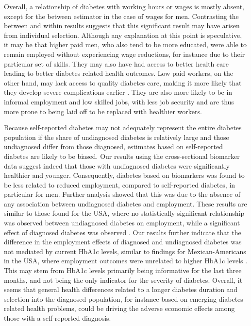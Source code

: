 \documentclass[12pt,english]{article}
\begin{document}
Overall, a relationship of diabetes with working hours or wages is mostly absent, except for the between estimator in the case of wages for men. Contrasting the between and within results suggests that this significant result may have arisen from individual selection. Although any explanation at this point is speculative, it may be that higher paid men, who also tend to be more educated, were able to remain employed without experiencing wage reductions, for instance due to their particular set of skills. They may also have had access to better health care leading to better diabetes related health outcomes. Low paid workers, on the other hand, may lack access to quality diabetes care, making it more likely that they develop severe complications earlier \parencite{Flores-Hernandez2015}. They are also more likely to be in informal employment and low skilled jobs, with less job security and are thus more prone to being laid off to be replaced with healthier workers.

Because self-reported diabetes may not adequately represent the entire diabetes population if the share of undiagnosed diabetes is relatively large and those undiagnosed differ from those diagnosed, estimates based on self-reported diabetes are likely to be biased. Our results using the cross-sectional biomarker data suggest indeed that  those with undiagnosed diabetes were significantly healthier and younger. Consequently, diabetes based on biomarkers was found to be less related to reduced employment, compared to self-reported diabetes, in particular for men. Further analysis showed that this was due to the absence of any association between undiagnosed diabetes and employment. These results are similar to those found for the USA, where no statistically significant relationship was observed between undiagnosed diabetes on employment, while a significant effect of diagnosed diabetes was observed \parencite{Minor2015}. Our results further indicate that the  difference in the employment effects of diagnosed and undiagnosed diabetes was not mediated by current \ac{HbA1c} levels, similar to findings for Mexican-Americans in the USA, where employment outcomes were unrelated to higher \ac{HbA1c} levels \parencite{BrownIII2011}. This may stem from \ac{HbA1c} levels primarily being informative for the last three months, and not being the only indicator for the severity of diabetes. Overall, it seems that general health differences related to a longer diabetes duration and selection into the diagnosed population, for instance based on emerging diabetes related health problems, could be driving the adverse economic effects among those with a self-reported diagnosis.
\end{document}
